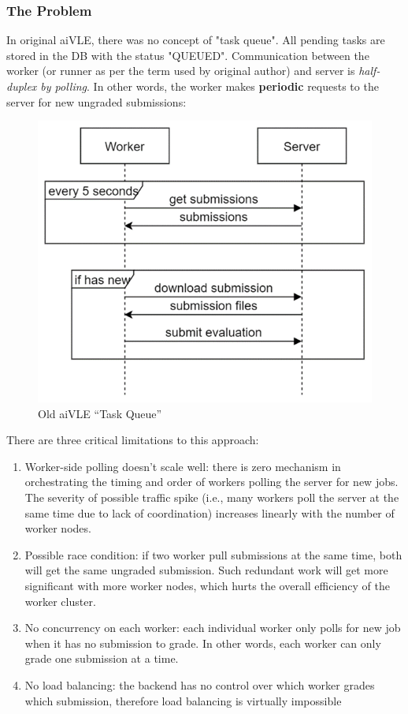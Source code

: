 \subsubsection{The Problem}
In original aiVLE, there was no concept of "task queue". All pending tasks are stored in the DB with the status "QUEUED". Communication between the worker (or runner as per the term used by original author) and server is \textit{half-duplex by polling}. In other words, the worker makes \textbf{periodic} requests to the server for new ungraded submissions:
\begin{figure}[H]
    \centering
    \includegraphics{images/aivle-web-old-task-queue.png}
    \caption{Old aiVLE “Task Queue”}
    \label{fig:aivle-web-old-task-queue}
\end{figure}
There are three critical limitations to this approach:
\begin{enumerate}
    \item Worker-side polling doesn't scale well: there is zero mechanism in orchestrating the timing and order of workers polling the server for new jobs. The severity of possible traffic spike (i.e., many workers poll the server at the same time due to lack of coordination) increases linearly with the number of worker nodes.
    \item Possible race condition: if two worker pull submissions at the same time, both will get the same ungraded submission. Such redundant work will get more significant with more worker nodes, which hurts the overall efficiency of the worker cluster.
    \item No concurrency on each worker: each individual worker only polls for new job when it has no submission to grade. In other words, each worker can only grade one submission at a time.
    \item No load balancing: the backend has no control over which worker grades which submission, therefore load balancing is virtually impossible
\end{enumerate}

